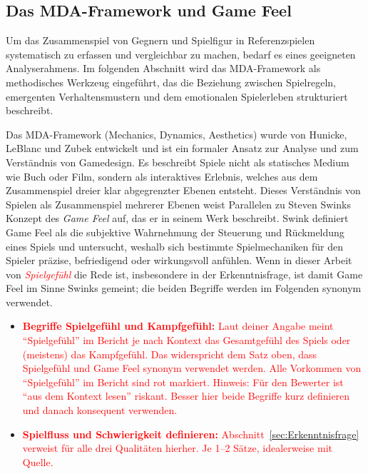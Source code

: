 \documentclass[../Main.tex]{subfiles}
\begin{document}
\subsection{Das MDA-Framework und Game Feel}
Um das Zusammenspiel von Gegnern und Spielfigur in Referenzspielen systematisch zu erfassen und vergleichbar zu machen, bedarf es eines geeigneten Analyserahmens. Im folgenden Abschnitt wird das MDA-Framework als methodisches Werkzeug eingeführt, das die Beziehung zwischen Spielregeln, emergenten Verhaltensmustern und dem emotionalen Spielerleben strukturiert beschreibt.

Das MDA-Framework (Mechanics, Dynamics, Aesthetics) wurde von Hunicke, LeBlanc und Zubek entwickelt und ist ein formaler Ansatz zur Analyse und zum Verständnis von Gamedesign. Es beschreibt Spiele nicht als statisches Medium wie Buch oder Film, sondern als interaktives Erlebnis, welches aus dem Zusammenspiel dreier klar abgegrenzter Ebenen entsteht. Dieses Verständnis von Spielen als Zusammenspiel mehrerer Ebenen weist Parallelen zu Steven Swinks Konzept des \textit{Game Feel} auf, das er in seinem Werk  beschreibt. Swink definiert Game Feel als die subjektive Wahrnehmung der Steuerung und Rückmeldung eines Spiels und untersucht, weshalb sich bestimmte Spielmechaniken für den Spieler präzise, befriedigend oder wirkungsvoll anfühlen.\autocite[s.1-s.6]{swink2008gamefeel} Wenn in dieser Arbeit von \textit{\textcolor{red}{Spielgefühl}} die Rede ist, insbesondere in der Erkenntnisfrage, ist damit Game Feel im Sinne Swinks gemeint; die beiden Begriffe werden im Folgenden synonym verwendet.

\begin{itemize}[leftmargin=1.5cm]
    \item \textcolor{red}{\textbf{Begriffe Spielgefühl und Kampfgefühl:} Laut deiner Angabe meint \enquote{Spielgefühl} im Bericht je nach Kontext das Gesamtgefühl des Spiels oder (meistens) das Kampfgefühl. Das widerspricht dem Satz oben, dass Spielgefühl und Game Feel synonym verwendet werden. Alle Vorkommen von \enquote{Spielgefühl} im Bericht sind rot markiert. Hinweis: Für den Bewerter ist \enquote{aus dem Kontext lesen} riskant. Besser hier beide Begriffe kurz definieren und danach konsequent verwenden.}
    \item \textcolor{red}{\textbf{Spielfluss und Schwierigkeit definieren:} Abschnitt~\ref{sec:Erkenntnisfrage} verweist für alle drei Qualitäten hierher. Je 1--2 Sätze, idealerweise mit Quelle.}
\end{itemize}
\end{document}
